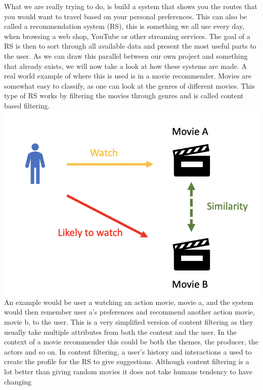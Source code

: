 What we are really trying to do, is build a system that shows you the routes that you would want to travel based on your
personal preferences.
This can also be called a recommendation system (RS), this is something we all use every day, when browsing a web shop,
YouTube or other streaming services.
The goal of a RS is then to sort through all available data and present the most useful parts to the user.
As we can draw this parallel between our own project and something that already exists, we will now take a look at how
these systems are made.
\vspace{5mm}
A real world example of where this is used is in a movie recommender.
Movies are somewhat easy to classify, as one can look at the genres of different movies.
This type of RS works by filtering the movies through genres and is called content based filtering. \newline
\includegraphics[width =\textwidth]{images/content-filtering}
An example would be user a watching an action movie, movie a, and the system would then remember user a's preferences
and recommend another action movie, movie b, to the user.
\newline
This is a very simplified version of content filtering as they usually take multiple attributes from both the content
and the user.
In the context of a movie recommender this could be both the themes, the producer, the actors and so on.
\newline
In content filtering, a user's history and interactions a used to create the profile for the RS to give suggestions.
Although content filtering is a lot better than giving random movies it does not take humans tendency to have changing
